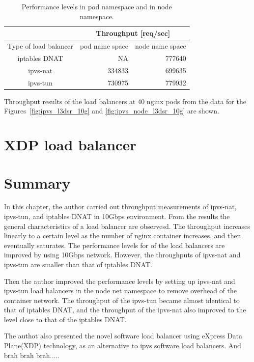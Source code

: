 \begin{table}[h]
  \centering
  \begin{tabular}{|l|r|r|}
    \hline
    & \multicolumn{2}{c|}{Throughput {[}req/sec{]}} \\ \hline
    Type of load balancer & \multicolumn{1}{c|}{pod name space} & \multicolumn{1}{c|}{node name space} \\ \hline
    \multicolumn{1}{|c|}{iptables DNAT} & NA & \cellcolor[HTML]{ECF4FF}777640 \\ \hline
    \multicolumn{1}{|c|}{ipvs-nat} & \cellcolor[HTML]{ECF4FF}334833 & \cellcolor[HTML]{FFF3F3}699635 \\ \hline
    \multicolumn{1}{|c|}{ipvs-tun} & \cellcolor[HTML]{ECF4FF}730975 & \cellcolor[HTML]{FFF3F3}779932 \\ \hline
  \end{tabular}
  \caption{Performance levels in pod namespace and in node namespace.}
  \raggedright
  Throughput results of the load balancers at 40 nginx pods from the data for the Figures~\ref{fig:ipvs_l3dsr_10g} and \ref{fig:ipvs_node_l3dsr_10g} are shown.
  \label{table:nat_tun_dnat_pod_node}
\end{table}

\FloatBarrier
\section{XDP load balancer}

\section{Summary}

In this chapter, the author carried out throughput measurements of ipvs-nat, ipvs-tun, and iptables DNAT in 10Gbps environment.
From the results the general characteristics of a load balancer are observesd.
The throughput increases linearly to a certain level as the number of nginx container increases, and then eventually saturates.
The performance levels for of the load balancers are improved by using 10Gbps network.
However, the throughputs of ipvs-nat and ipvs-tun are smaller than that of iptables DNAT.

Then the author improved the performance levels by setting up ipvs-nat and ipvs-tun load balancers in the node net namespace to remove overhead of the container network.
The throughput of the ipvs-tun became almost identical to that of iptables DNAT, and the throughput of the ipvs-nat also improved to the level close to that of the iptables DNAT.

The authot also presented the novel software load balancer using eXpress Data Plane(XDP) technology, as an alternative to ipvs software load balancers.
And brah brah brah.....



